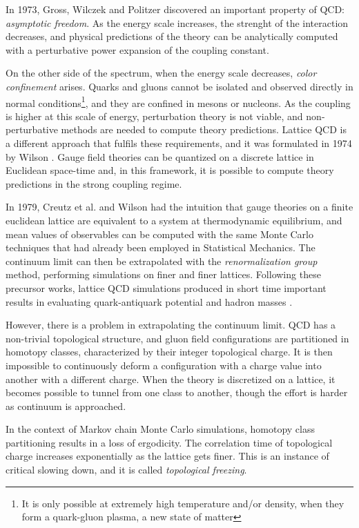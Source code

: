 In 1973, Gross, Wilczek \cite{gross-wilczek:1973} and Politzer \cite{politzer:1973} discovered an important property of QCD: \emph{asymptotic freedom}.
As the energy scale increases, the strenght of the interaction decreases,
and physical predictions of the theory can be analytically computed with a perturbative power expansion of the coupling constant.

On the other side of the spectrum, when the energy scale decreases, \emph{color confinement} arises.
Quarks and gluons cannot be isolated and observed directly in normal conditions\footnote{It is only possible at extremely high temperature and/or density, when they form a quark-gluon plasma, a new state of matter},
and they are confined in mesons or nucleons.
As the coupling is higher at this scale of energy, perturbation theory is not viable, and non-perturbative methods are needed to compute theory predictions.
Lattice QCD is a different approach that fulfils these requirements, and it was formulated in 1974 by Wilson \cite{wilson:1974}.
Gauge field theories can be quantized on a discrete lattice in Euclidean space-time and,
in this framework, it is possible to compute theory predictions in the strong coupling regime.

In 1979, Creutz et al.\@ \cite{creutz:1979} and Wilson \cite{wilson:1980}
had the intuition that gauge theories on a finite euclidean lattice are equivalent to a system at thermodynamic equilibrium,
and mean values of observables can be computed with the same Monte Carlo techniques that had already been employed in Statistical Mechanics.
The continuum limit can then be extrapolated with the \emph{renormalization group} method, performing simulations on finer and finer lattices.
Following these precursor works, lattice QCD simulations produced in short time important results in evaluating quark-antiquark potential and hadron masses
\cite{creutz:1980, hamber-parisi:1981, weingarten:1982}.

However, there is a problem in extrapolating the continuum limit.
QCD has a non-trivial topological structure, and gluon field configurations are partitioned in homotopy classes, characterized by their integer topological charge.
It is then impossible to continuously deform a configuration with a charge value into another with a different charge.
When the theory is discretized on a lattice, it becomes possible to tunnel from one class to another,
though the effort is harder as continuum is approached.

In the context of Markov chain Monte Carlo simulations, homotopy class partitioning results in a loss of ergodicity.
The correlation time of topological charge increases exponentially as the lattice gets finer.
This is an instance of critical slowing down, and it is called \emph{topological freezing}.

